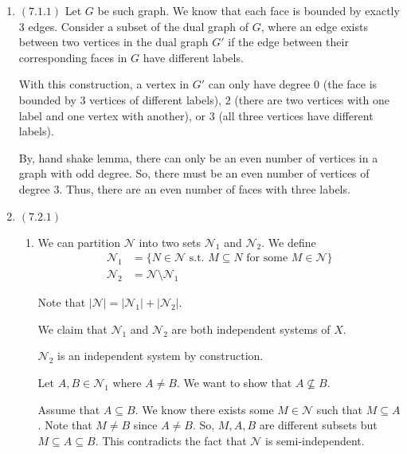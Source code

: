 \documentclass[12pt]{article}
\begin{document}

\begin{enumerate}[start=1,label={\bfseries Problem \arabic*:},leftmargin=1in] %
    \item $(7.1.1)$ Let $G$ be such graph. We know that each face is bounded by exactly 3 edges. Consider a subset of the dual graph of $G$, where an edge 
    exists between two vertices in the dual graph $G'$ if the edge between their corresponding faces in $G$ have different labels. 

    With this construction, a vertex in $G'$ can only have degree $0$ (the face is bounded by 3 vertices of different labels), $2$ (there are two vertices with one label and one vertex with another), or $3$ (all three vertices have different labels).
    
    By, hand shake lemma, there can only be an even number of vertices in a graph with odd degree. So, there must be an even number of vertices of degree 3. Thus, there are an even number of faces with three labels. 
    \item $(7.2.1)$
    \begin{enumerate}
        \item We can partition $\mathcal{N}$ into two sets $\mathcal{N}_{1}$ and $\mathcal{N}_{2}$. 
        We define 
        \begin{align*}
            \mathcal{N}_{1} &= \{ N \in \mathcal{N} \text{ s.t. } M \subseteq N  \text{ for some } M \in \mathcal{N} \}\\ 
            \mathcal{N}_{2} &= \mathcal{N} \setminus \mathcal{N}_1
        \end{align*}
        
        Note that $\left| \mathcal{N} \right| = \left| \mathcal{N}_1 \right|  + \left| \mathcal{N}_2 \right|$. 
    
        We claim that $\mathcal{N}_{1}$ and $\mathcal{N}_2$ are both independent systems of $X$. 
        
        $\mathcal{N}_2$ is an independent system by construction.
    
        Let $A, B \in \mathcal{N}_1$ where $A \neq B$. We want to show that $A \not \subseteq B$. 
    
        Assume that $A \subseteq B$. We know there exists some $M \in \mathcal{N}$ such that $M \subseteq A$. 
        Note that $M \neq B$ since $A \neq B$. So, $M, A, B$ are different subsets but $M \subseteq A \subseteq B$. This contradicts the fact that $\mathcal{N}$ is semi-independent. 


\end{enumerate}
\end{enumerate}
\end{document}
